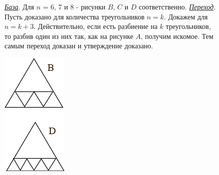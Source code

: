 {\begin{figure}[h]
\begin{minipage}{0.62\linewidth}
\begin{prf}
    \par
    \textit{\underline{База}}. Для $n$ = 6, 7 и 8 - рисунки $B$, $C$ и $D$ соответственно.
    \textit{\underline{Переход}}. Пусть доказано для количества треугольников $n = k$. Докажем для $n = k + 3$. Действительно, если есть разбиение на $k$ треугольников, то разбив один из них так, как на рисунке $A$, получим искомое. Тем самым переход доказан и утверждение доказано. 
\end{prf}
\end{minipage}
\hfill
\begin{minipage}{0.15\linewidth}
    \includegraphics[width=0.95\columnwidth]{img/triangles2.png}
\end{minipage}
\end{figure}}

